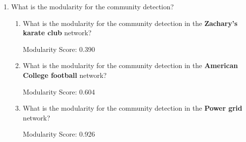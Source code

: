 \documentclass{amsart}
\theoremstyle{definition}
\theoremstyle{remark}
\numberwithin{equation}{section}
\begin{document}
\begin{enumerate}
\begin{enumerate}
    \end{enumerate}
    \item What is the modularity for the community detection? \vspace{0.5 cm}
    \begin{enumerate}
        \item What is the modularity for the community detection in the \textbf{Zachary’s karate club} network? \vspace{0.5 cm}

        Modularity Score: 0.390 

        \vspace{0.5 cm}

        \item What is the modularity for the community detection in the \textbf{American College football} network? \vspace{0.5 cm}

        Modularity Score: 0.604

        \vspace{0.5 cm}

        \item What is the modularity for the community detection in the \textbf{Power grid} network? \vspace{0.5 cm}

        Modularity Score: 0.926 

        \vspace{0.5 cm}

    \end{enumerate}
\end{enumerate}
\end{document}

